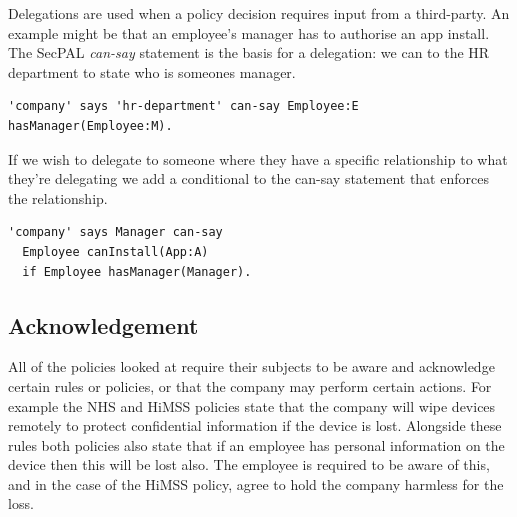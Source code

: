 \documentclass{llncs}
\begin{document}
Delegations are used when a policy decision requires input from a third-party.
An example might be that an employee's manager has to authorise an app install.
The SecPAL \emph{can-say} statement is the basis for a delegation: we can to the HR department to state who is someones manager.
\begin{lstlisting}
'company' says 'hr-department' can-say Employee:E hasManager(Employee:M).
\end{lstlisting}
If we wish to delegate to someone where they have a specific relationship to what they're delegating we add a conditional to the can-say statement that enforces the relationship.
\begin{lstlisting}
'company' says Manager can-say 
  Employee canInstall(App:A)
  if Employee hasManager(Manager).
\end{lstlisting}

\subsection{Acknowledgement}

All of the policies looked at require their subjects to be aware and acknowledge certain rules or policies, 
  or that the company may perform certain actions.
For example the NHS and HiMSS policies state that the company will wipe devices remotely to protect confidential information if the device is lost.
Alongside these rules both policies also state that if an employee has personal information on the device then this will be lost also.
The employee is required to be aware of this, and in the case of the HiMSS policy, agree to hold the company harmless for the loss.
\end{document}
